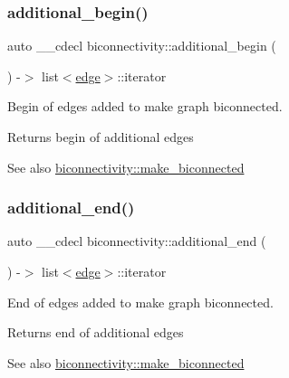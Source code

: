 \subsubsection{\texorpdfstring{additional\+\_\+begin()}{additional\_begin()}}
{\footnotesize\ttfamily auto \+\_\+\+\_\+cdecl biconnectivity\+::additional\+\_\+begin (\begin{DoxyParamCaption}{ }\end{DoxyParamCaption}) -\/$>$ list$<$\mbox{\hyperlink{classedge}{edge}}$>$\+::iterator
	\hspace{0.3cm}{\ttfamily [inline]}}



Begin of edges added to make graph biconnected. 

\begin{DoxyReturn}{Returns}
begin of additional edges 
\end{DoxyReturn}
\begin{DoxySeeAlso}{See also}
\mbox{\hyperlink{classbiconnectivity_a58014d7166628862c2bb064624b9a888}{biconnectivity\+::make\+\_\+biconnected}} 
\end{DoxySeeAlso}
\mbox{\label{classbiconnectivity_a8efa922c941f73613a3083fbd3e9b5df}} 
\subsubsection{\texorpdfstring{additional\+\_\+end()}{additional\_end()}}
{\footnotesize\ttfamily auto \+\_\+\+\_\+cdecl biconnectivity\+::additional\+\_\+end (\begin{DoxyParamCaption}{ }\end{DoxyParamCaption}) -\/$>$ list$<$\mbox{\hyperlink{classedge}{edge}}$>$\+::iterator
	\hspace{0.3cm}{\ttfamily [inline]}}



End of edges added to make graph biconnected. 

\begin{DoxyReturn}{Returns}
end of additional edges 
\end{DoxyReturn}
\begin{DoxySeeAlso}{See also}
\mbox{\hyperlink{classbiconnectivity_a58014d7166628862c2bb064624b9a888}{biconnectivity\+::make\+\_\+biconnected}} 
\end{DoxySeeAlso}
\mbox{\label{classbiconnectivity_a97dc2fa637bb39fc108e2ed644fe2884}} 
